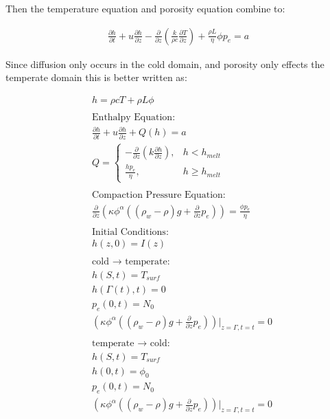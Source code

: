 \documentclass[a4paper,12pt]{article}
\newcommand{\pd}[2]{\frac{\partial #1}{\partial #2}}
\begin{document}
Then the temperature equation and porosity equation combine to:

\begin{align*}
\pd{h}{t} + u \pd{h}{z} - \pd{}{z}\left(\frac{k}{\rho c}\pd{T}{z}\right) + \frac{\rho L}{\eta}\phi p_e = a
\end{align*}

Since diffusion only occurs in the cold domain, and porosity only effects the temperate domain this is better written as:

\begin{align*}
  &h = \rho c T + \rho L \phi\\
  \\
  &\text{Enthalpy Equation:}\\
  &\pd{h}{t} + u \pd{h}{z} + Q(h) = a\\
  &Q =
  \begin{cases}
    - \pd{}{z}\left(k\pd{h}{z}\right), & h < h_{melt}\\
    \frac{hp_e}{\eta}, & h \geq h_{melt}
  \end{cases}\\
  \\
  &\text{Compaction Pressure Equation:}\\
  &\pd{}{z}\left(\kappa\phi^\alpha\left((\rho_w - \rho)g + \pd{}{z}p_e\right)\right) = \frac{\phi p_e}{\eta}\\\\
  &\text{Initial Conditions:}\\
  &h(z, 0) = I(z)\\\\
  &\text{cold } \rightarrow \text{ temperate: }\\
  &h(S, t) = T_{surf}\\
  &h(\Gamma(t), t) = 0\\
  &p_e(0,t) = N_0\\
  &\left(\kappa \phi^\alpha\left( (\rho_w - \rho)g + \pd{}{z} p_e\right)\right)\bigg\rvert_{z=\Gamma, t=t} = 0\\\\
  &\text{temperate } \rightarrow \text{ cold: }\\
  &h(S, t) = T_{surf}\\
  &h(0, t) = \phi_0\\
  &p_e(0,t) = N_0\\
  &\left(\kappa \phi^\alpha\left( (\rho_w - \rho)g + \pd{}{z} p_e\right)\right)\bigg\rvert_{z=\Gamma, t=t} = 0\\
\end{align*}
\end{document}
